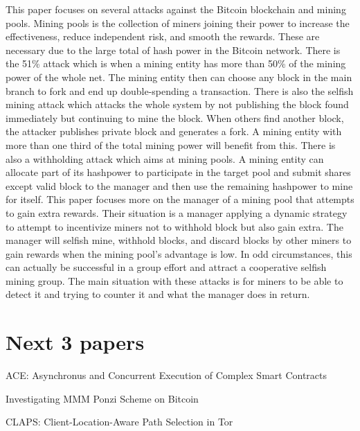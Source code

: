 \documentclass{article}
\begin{document}
This paper focuses on several attacks against the Bitcoin blockchain and mining pools. Mining pools is the collection of miners joining their power to increase the effectiveness, reduce independent risk, and smooth the rewards. These are necessary due to the large total of hash power in the Bitcoin network. There is the 51\% attack which is when a mining entity has more than 50\% of the mining power of the whole net. The mining entity then can choose any block in the main branch to fork and end up double-spending a transaction. There is also the selfish mining attack which attacks the whole system by not publishing the block found immediately but continuing to mine the block. When others find another block, the attacker publishes private block and generates a fork. A mining entity with more than one third of the total mining power will benefit from this. There is also a withholding attack which aims at mining pools. A mining entity can allocate part of its hashpower to participate in the target pool and submit shares except valid block to the manager and then use the remaining hashpower to mine for itself. This paper focuses more on the manager of a mining pool that attempts to gain extra rewards. Their situation is a manager applying a dynamic strategy to attempt to incentivize miners not to withhold block but also gain extra. The manager will selfish mine, withhold blocks, and discard blocks by other miners to gain rewards when the mining pool's advantage is low. In odd circumstances, this can actually be successful in a group effort and attract a cooperative selfish mining group. The main situation with these attacks is for miners to be able to detect it and trying to counter it and what the manager does in return.

\section{Next 3 papers}
\item ACE: Asynchronus and Concurrent Execution of Complex Smart Contracts
\item Investigating MMM Ponzi Scheme on Bitcoin
\item CLAPS: Client-Location-Aware Path Selection in Tor
\printbibliography
\end{document}
